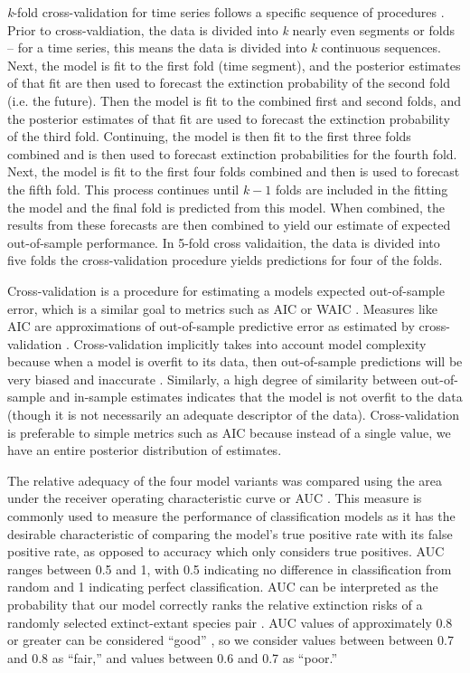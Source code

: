 \documentclass[12pt,letterpaper]{article}
\begin{document}
\begin{refsection}
\textit{k}-fold cross-validation for time series follows a specific sequence of procedures \citep{Arlot2010,Bergmeir2016,ESL}. Prior to cross-valdiation, the data is divided into \textit{k} nearly even segments or folds -- for a time series, this means the data is divided into \textit{k} continuous sequences. Next, the model is fit to the first fold (time segment), and the posterior estimates of that fit are then used to forecast the extinction probability of the second fold (i.e. the future). Then the model is fit to the combined first and second folds, and the posterior estimates of that fit are used to forecast the extinction probability of the third fold. Continuing, the model is then fit to the first three folds combined and is then used to forecast extinction probabilities for the fourth fold. Next, the model is fit to the first four folds combined and then is used to forecast the fifth fold. This process continues until $k - 1$ folds are included in the fitting the model and the final fold is predicted from this model. When combined, the results from these forecasts are then combined to yield our estimate of expected out-of-sample performance. In 5-fold cross validaition, the data is divided into five folds the cross-validation procedure yields predictions for four of the folds.

Cross-validation is a procedure for estimating a models expected out-of-sample error, which is a similar goal to metrics such as AIC or WAIC \citep{ESL,Gelman2013d}. Measures like AIC are approximations of out-of-sample predictive error as estimated by cross-validation \citep{ESL,Gelman2013d}. Cross-validation implicitly takes into account model complexity because when a model is overfit to its data, then out-of-sample predictions will be very biased and inaccurate \citep{ESL}. Similarly, a high degree of similarity between out-of-sample and in-sample estimates indicates that the model is not overfit to the data (though it is not necessarily an adequate descriptor of the data). Cross-validation is preferable to simple metrics such as AIC because instead of a single value, we have an entire posterior distribution of estimates.

The relative adequacy of the four model variants was compared using the area under the receiver operating characteristic curve or AUC \citep{Fawcett2006,Mason2002}. This measure is commonly used to measure the performance of classification models as it has the desirable characteristic of comparing the model's true positive rate with its false positive rate, as opposed to accuracy which only considers true positives. AUC ranges between 0.5 and 1, with 0.5 indicating no difference in classification from random and 1 indicating perfect classification. AUC can be interpreted as the probability that our model correctly ranks the relative extinction risks of a randomly selected extinct-extant species pair \citep{Fawcett2006,Mason2002}. AUC values of approximately 0.8 or greater can be considered ``good'' \citep{ACCDA}, so we consider values between between 0.7 and 0.8 as ``fair,'' and values between 0.6 and 0.7 as ``poor.''


\end{refsection}
\end{document}
